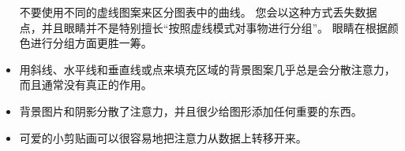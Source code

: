 \begin{itemize}
    不要使用不同的虚线图案来区分图表中的曲线。 您会以这种方式丢失数据点，并且眼睛并不是特别擅长``按照虚线模式对事物进行分组''。 眼睛在根据颜色进行分组方面更胜一筹。
    \item 用斜线、水平线和垂直线或点来填充区域的背景图案几乎总是会分散注意力，而且通常没有真正的作用。
    \item 背景图片和阴影分散了注意力，并且很少给图形添加任何重要的东西。
    \item 可爱的小剪贴画可以很容易地把注意力从数据上转移开来。
\end{itemize}

